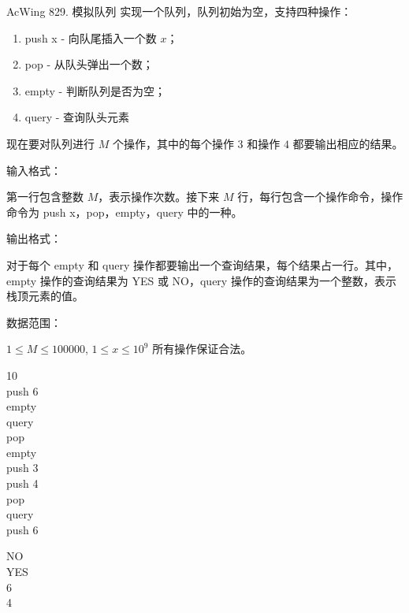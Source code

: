 \begin{titledbox}{AcWing 829. 模拟队列}
    实现一个队列，队列初始为空，支持四种操作：

    \begin{enumerate}
        \itemsep=-5pt
        \item push x - 向队尾插入一个数 $x$；
        \item pop - 从队头弹出一个数；
        \item empty - 判断队列是否为空；
        \item query - 查询队头元素
    \end{enumerate}

    现在要对队列进行 $M$ 个操作，其中的每个操作 $3$ 和操作 $4$ 都要输出相应的结果。

    输入格式：

    第一行包含整数 $M$，表示操作次数。接下来 $M$ 行，每行包含一个操作命令，操作命令为 push x，pop，empty，query 中的一种。

    输出格式：

    对于每个 empty 和 query 操作都要输出一个查询结果，每个结果占一行。其中，empty 操作的查询结果为 YES 或 NO，query 操作的查询结果为一个整数，表示栈顶元素的值。

    数据范围：

    $1 \le M \le 100000$, $1 \le x \le 10^9$ 所有操作保证合法。

    \begin{inputblock}
        10 \\
        push 6 \\
        empty \\
        query \\
        pop \\
        empty \\
        push 3 \\
        push 4 \\
        pop \\
        query \\
        push 6
    \end{inputblock}
    \begin{outputblock}
        NO \\
        YES \\
        6 \\
        4
    \end{outputblock}
\end{titledbox}

